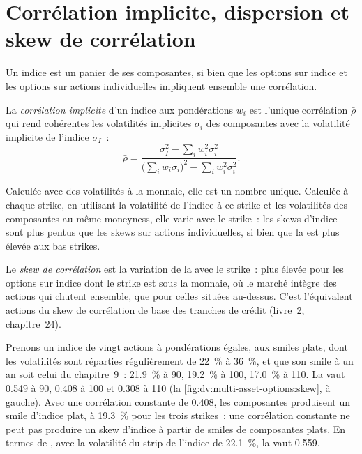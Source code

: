 \section{Corrélation implicite, dispersion et skew de corrélation}

Un indice est un panier de ses composantes, si bien que les options sur indice et les options sur actions individuelles impliquent ensemble une corrélation.

\begin{definition}\label{def:dv:multi-asset-options:implied}
La \emph{corrélation implicite} d'un indice aux pondérations $w_i$ est l'unique corrélation
$\bar\rho$ qui rend cohérentes les volatilités implicites $\sigma_i$ des composantes avec la volatilité implicite de l'indice
$\sigma_I$~:
\[
\bar\rho=\frac{\sigma_I^2-\sum_iw_i^2\sigma_i^2}{\bigl(\sum_iw_i\sigma_i\bigr)^2-\sum_iw_i^2\sigma_i^2}.
\]
\end{definition}

Calculée avec des volatilités à la monnaie, elle est un nombre unique. Calculée à chaque strike, en utilisant la volatilité de l'indice
à ce strike et les volatilités des composantes au même moneyness, elle varie avec le strike~: les skews d'indice sont plus pentus que
les skews sur actions individuelles, si bien que la  est plus élevée aux bas strikes.

\begin{definition}\label{def:dv:multi-asset-options:skew}
Le \emph{skew de corrélation} est la variation de la  avec le strike~: plus élevée pour
les options sur indice dont le strike est sous la monnaie, où le marché intègre des actions qui chutent ensemble, que pour celles situées au-dessus. C'est
l'équivalent actions du skew de corrélation de base des tranches de crédit (livre~2, chapitre~24).
\end{definition}

\begin{example}\label{ex:dv:multi-asset-options:index}
Prenons un indice de vingt actions à pondérations égales, aux smiles plats, dont les volatilités sont réparties régulièrement de 22~\% à 36~\%, et que
son smile à un an soit celui du chapitre~9~: 21.9~\% à 90, 19.2~\% à 100, 17.0~\% à 110. La  vaut 0.549 à 90,
0.408 à 100 et 0.308 à 110 (la \cref{fig:dv:multi-asset-options:skew}, à gauche). Avec une corrélation constante de 0.408,
les composantes produisent un smile d'indice plat, à 19.3~\% pour les trois strikes~: une corrélation constante ne peut pas produire un
skew d'indice à partir de smiles de composantes plats. En termes de , avec la volatilité du strip de l'indice de 22.1~\%, la 
vaut 0.559.
\end{example}

